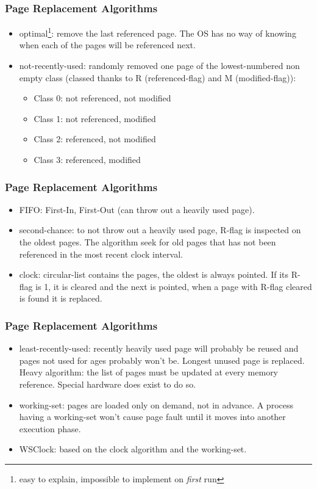   \begin{frame}
    \frametitle{Page Replacement Algorithms}
    \begin{itemize}
      \item optimal\footnote{easy to explain, impossible to implement on \emph{first} run}: remove the last referenced page. The OS has no way of knowing when each of the pages will be referenced next.
      \item not-recently-used: randomly removed one page of the lowest-numbered non empty class (classed thanks to R (referenced-flag) and M (modified-flag)):
      \begin{itemize}
        \item Class 0: not referenced, not modified
        \item Class 1: not referenced, modified
        \item Class 2: referenced, not modified
        \item Class 3: referenced, modified
      \end{itemize}
    \end{itemize}
  \end{frame}

  \begin{frame}
    \frametitle{Page Replacement Algorithms}
    \begin{itemize}
      \item FIFO: First-In, First-Out (can throw out a heavily used page).
      \item second-chance: to not throw out a heavily used page, R-flag is inspected on the oldest pages. The algorithm seek for old pages that has not been referenced in the most recent clock interval.
      \item clock: circular-list contains the pages, the oldest is always pointed. If its R-flag is 1, it is cleared and the next is pointed, when a page with R-flag cleared is found it is replaced.
    \end{itemize}
  \end{frame}

  \begin{frame}
    \frametitle{Page Replacement Algorithms}
    \begin{itemize}
      \item least-recently-used: recently heavily used page will probably be reused and pages not used for ages probably won't be. Longest unused page is replaced. Heavy algorithm: the list of pages must be updated at every memory reference. Special hardware does exist to do so.
      \item working-set: pages are loaded only on demand, not in advance. A process having a working-set won't cause page fault until it moves into another execution phase.
      \item WSClock: based on the clock algorithm and the working-set.
    \end{itemize}
  \end{frame}


